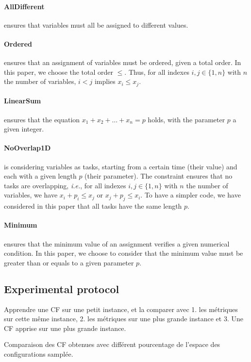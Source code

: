 \documentclass{article}
\newcommand{\ie}{\textit{i.e.}}
\begin{document}
\paragraph{AllDifferent} ensures  that variables must all  be assigned
to different values.
\paragraph{Ordered} ensures  that an  assignment of variables  must be
ordered, given a total order. In this paper, we choose the total order
$\leq$. Thus, for all indexes $i,j \in \{1,n\}$ with $n$ the number of
variables, $i < j$ implies $x_i \leq x_j$.
\paragraph{LinearSum}       ensures       that      the       equation
$x_1 + x_2 +  \ldots + x_n = p$ holds, with the  parameter $p$ a given
integer.
\paragraph{NoOverlap1D}  is considering  variables as  tasks, starting
from a  certain time (their  value) and each  with a given  length $p$
(their  parameter).    The  constraint  ensures  that   no  tasks  are
overlapping,  \ie, for  all indexes  $i,j  \in \{1,n\}$  with $n$  the
number   of   variables,  we   have   $x_i   +   p_i  \leq   x_j$   or
$x_j + p_j \leq  x_i$.  To have a simpler code,  we have considered in
this paper that all tasks have the same length $p$.
\paragraph{Minimum} ensures  that the  minimum value of  an assignment
verifies  a given  numerical condition.  In this  paper, we  choose to
consider that  the minimum value must  be greater than or  equals to a
given parameter $p$.

\subsection{Experimental protocol}



Apprendre une  CF sur une petit  instance, et la comparer  avec 1. les
métriques  sur cette  même instance,  2.  les métriques  sur une  plus
grande instance et 3. Une CF apprise sur une plus grande instance.

Comparaison des CF obtenues avec différent pourcentage de l'espace des
configurations samplée.
\end{document}
